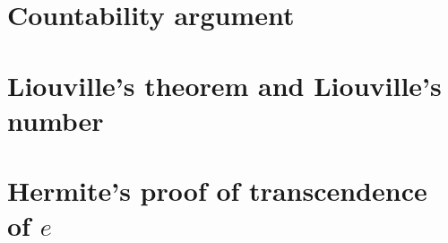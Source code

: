 \documentclass{report}
\theoremstyle{definition}
\theoremstyle{plain}
\begin{document}
\section{Countability argument}\label{fmlsn:count}
\section{Liouville's theorem and Liouville's number}\label{fmlsn:li}
\section{Hermite's proof of transcendence of $e$}\label{fmlsn:e}



%
\nocite{*}
\printbibliography[heading=bibintoc]

\end{document}
